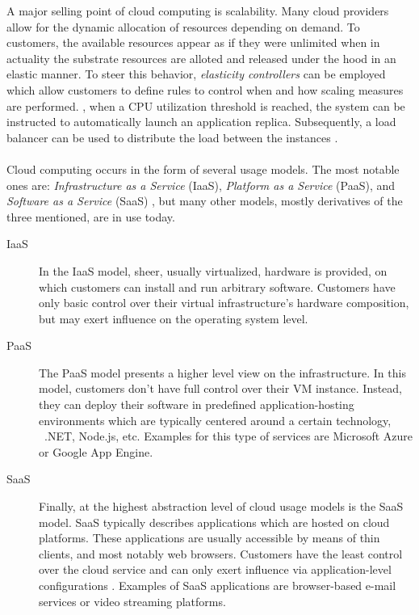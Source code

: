 A major selling point of cloud computing is scalability. Many cloud providers allow for the dynamic allocation of resources depending on demand. To customers, the available resources appear as if they were unlimited when in actuality the substrate resources are alloted and released under the hood in an elastic manner. To steer this behavior, \emph{elasticity controllers} can be employed which allow customers to define rules to control when and how scaling measures are performed. \Eg , when a CPU utilization threshold is reached, the system can be instructed to automatically launch an application replica. Subsequently, a load balancer can be used to distribute the load between the instances \cite{vaquero2011dynamically}.


\paragraph{}
Cloud computing occurs in the form of several usage models. The most notable ones are: \emph{Infrastructure as a Service} (IaaS),  \emph{Platform as a Service} (PaaS), and \emph{Software as a Service} (SaaS) \cite{mell2011nist}, but many other models, mostly derivatives of the three mentioned, are in use today.

\begin{description}
\item[IaaS] In the IaaS model, sheer, usually virtualized, hardware is provided, on which customers can install and run arbitrary software. Customers have only basic control over their virtual infrastructure's hardware composition, but may exert influence on the operating system level.
\item[PaaS] The PaaS model presents a higher level view on the infrastructure. In this model, customers don't have full control over their VM instance. Instead, they can deploy their software in predefined application-hosting environments \cite{mell2011nist} which are typically centered around a certain technology, \eg\ .NET, Node.js, etc. Examples for this type of services are Microsoft Azure or Google App Engine.
\item[SaaS] Finally, at the highest abstraction level of cloud usage models is the SaaS model. SaaS typically describes applications which are hosted on cloud platforms. These applications are usually accessible by means of thin clients, and most notably web browsers. Customers have the least control over the cloud service and can only exert influence via application-level configurations \cite{mell2011nist}. Examples of SaaS applications are browser-based e-mail services or video streaming platforms.
\end{description}

